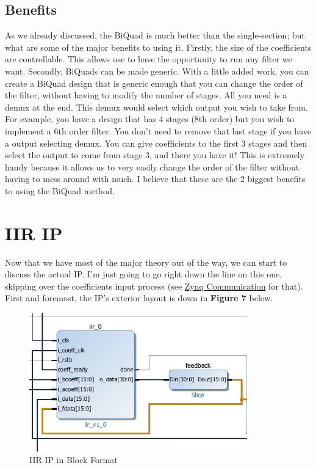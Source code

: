 \documentclass[12pt,a4paper,titlepage]{article}
\begin{document}
\subsection{Benefits}
As we already discussed, the BiQuad is much better than the single-section; but
what are some of the major benefits to using it. Firstly, the size of the
coefficients are controllable. This allows use to have the opportunity to run
any filter we want. Secondly, BiQuads can be made generic. With a little added
work, you can create a BiQuad design that is generic enough that you can change
the order of the filter, without having to modify the number of stages. All you
need is a demux at the end. This demux would select which output you wish to
take from. For example, you have a design that has 4 stages (8th order) but you
wish to implement a 6th order filter. You don't need to remove that last stage
if you have a output selecting demux. You can give coefficients to the first 3
stages and then select the output to come from stage 3, and there you have it!
This is extremely handy because it allows us to very easily change the order of
the filter without having to mess around with much. I believe that these are the
2 biggest benefits to using the BiQuad method.

\section{IIR IP}
Now that we have most of the major theory out of the way, we can start to
discuss the actual IP. I'm just going to go right down the line on this one,
skipping over the coefficients input process (see \hyperref[sec:zynq]{Zynq
  Communication} for that). First and foremost, the IP's exterior layout is
  down in \textbf{Figure 7} below.

\begin{figure}[!htb]
  \centering
  \includegraphics[height=6cm]
                  {../presentation/iir-ip-external-feedback.png}
                  \caption{IIR IP in Block Format}
\end{figure}
\end{document}
